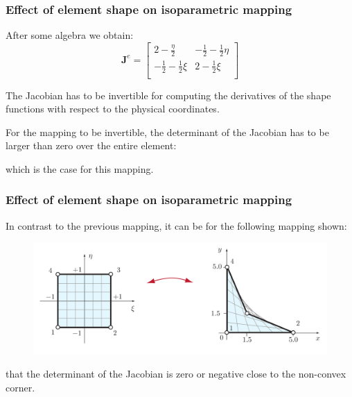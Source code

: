 \documentclass[notes]{beamer}
\begin{document}
\begin{frame}
\frametitle{Effect of element shape on isoparametric mapping}
After some algebra we obtain:
\begin{equation*}
\mathbf{J}^e%
=%
\begin{bmatrix}
2 - \frac{\eta}{2} & -\frac{1}{2} -\frac{1}{2}\eta \\
 -\frac{1}{2} -\frac{1}{2}\xi & 2 - \frac{1}{2}\xi \\
\end{bmatrix}
\end{equation*}

The Jacobian has to be invertible for computing the derivatives of the shape functions with
respect to the physical coordinates.

For the mapping to be invertible, the determinant of the Jacobian has to be larger than zero over the entire element:

which is the case for this mapping.
\end{frame}


\begin{frame}
\frametitle{Effect of element shape on isoparametric mapping}
In contrast to the previous mapping, it can be for the following mapping shown:
\begin{figure}[ht]
	\centering
	\includegraphics[width=\textwidth]{figs/2d-isoparametric-example-negative-jacobian.png}
\end{figure}
that the determinant of the Jacobian is zero or negative close to the non-convex corner.
\end{frame}
\end{document}
